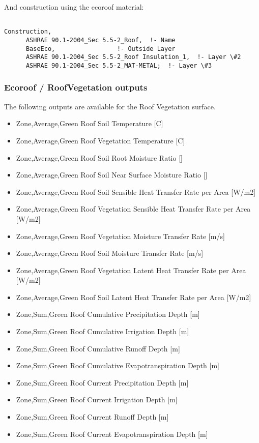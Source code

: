 And construction using the ecoroof material:

\begin{lstlisting}

Construction,
      ASHRAE 90.1-2004_Sec 5.5-2_Roof,  !- Name
      BaseEco,                 !- Outside Layer
      ASHRAE 90.1-2004_Sec 5.5-2_Roof Insulation_1,  !- Layer \#2
      ASHRAE 90.1-2004_Sec 5.5-2_MAT-METAL;  !- Layer \#3
\end{lstlisting}

\subsubsection{Ecoroof / RoofVegetation outputs}\label{ecoroof-roofvegetation-outputs}

The following outputs are available for the Roof Vegetation surface.

\begin{itemize}
\item
  Zone,Average,Green Roof Soil Temperature {[}C{]}
\item
  Zone,Average,Green Roof Vegetation Temperature {[}C{]}
\item
  Zone,Average,Green Roof Soil Root Moisture Ratio {[]}
\item
  Zone,Average,Green Roof Soil Near Surface Moisture Ratio {[]}
\item
  Zone,Average,Green Roof Soil Sensible Heat Transfer Rate per Area {[}W/m2{]}
\item
  Zone,Average,Green Roof Vegetation Sensible Heat Transfer Rate per Area {[}W/m2{]}
\item
  Zone,Average,Green Roof Vegetation Moisture Transfer Rate {[}m/s{]}
\item
  Zone,Average,Green Roof Soil Moisture Transfer Rate {[}m/s{]}
\item
  Zone,Average,Green Roof Vegetation Latent Heat Transfer Rate per Area {[}W/m2{]}
\item
  Zone,Average,Green Roof Soil Latent Heat Transfer Rate per Area {[}W/m2{]}
\item
  Zone,Sum,Green Roof Cumulative Precipitation Depth {[}m{]}
\item
  Zone,Sum,Green Roof Cumulative Irrigation Depth {[}m{]}
\item
  Zone,Sum,Green Roof Cumulative Runoff Depth {[}m{]}
\item
  Zone,Sum,Green Roof Cumulative Evapotranspiration Depth {[}m{]}
\item
  Zone,Sum,Green Roof Current Precipitation Depth {[}m{]}
\item
  Zone,Sum,Green Roof Current Irrigation Depth {[}m{]}
\item
  Zone,Sum,Green Roof Current Runoff Depth {[}m{]}
\item
  Zone,Sum,Green Roof Current Evapotranspiration Depth {[}m{]}
\end{itemize}

